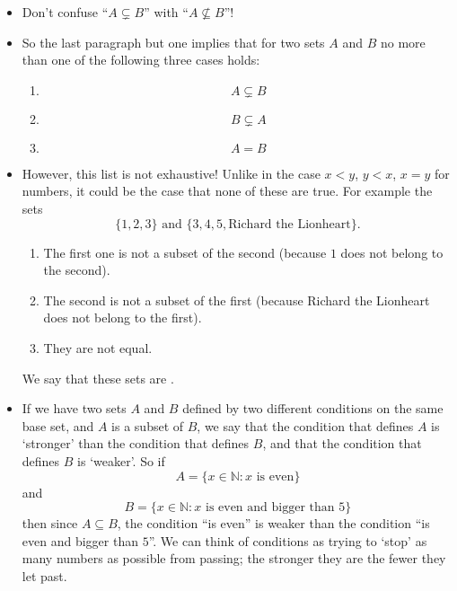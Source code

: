 \begin{itemize}
\item
Don't confuse ``$A \varsubsetneq B$'' with ``$A \nsubseteq B$''!
\item
So the last paragraph but one implies that for two sets $A$ and $B$ no more than one of the following three cases holds:
\begin{enumerate}
\item
\[ A \varsubsetneq B \]
\item
\[ B \varsubsetneq A \] 
\item
\[ A = B \]
\end{enumerate}
\item
However, this list is not exhaustive! Unlike in the case $x < y$, $y < x$, $x = y$ for numbers, it could be the case that none of these are true. For example the sets
\[ \{ 1, 2, 3\} \text{ and } \{ 3, 4, 5, \text{Richard the Lionheart} \} .\]
\begin{enumerate}
\item
The first one is not a subset of the second (because $1$ does not belong to the second).
\item
The second is not a subset of the first (because Richard the Lionheart does not belong to the first).
\item
They are not equal.
\end{enumerate}
We say that these sets are .
\item
If we have two sets $A$ and $B$ defined by two different conditions on the same base set, and $A$ is a subset of $B$, we say that the condition that defines $A$ is `stronger' than the condition that defines $B$, and that the condition that defines $B$ is `weaker'. So if 
\[ A = \{ x \in \mathbb{N} : x \text{ is even} \} \]
and 
\[ B = \{ x \in \mathbb{N} : x \text{ is even and bigger than } 5 \} \]
then since $A \subseteq B$, the condition ``is even'' is weaker than the condition ``is even and bigger than $5$''. We can think of conditions as trying to `stop' as many numbers as possible from passing; the stronger they are the fewer they let past.
\end{itemize}
